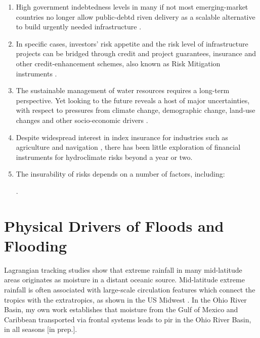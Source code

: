 \documentclass[11pt]{article}
\begin{document}
\begin{enumerate}
  \item High government indebtedness levels in many if not most emerging-market countries no longer allow public-debtd riven delivery as a scalable alternative to build urgently needed infrastructure \citep{WEF-instruments-2016}.
  \item In specific cases, investors' risk appetite and the risk level of infrastructure projects can be bridged through credit and project guarantees, insurance and other credit-enhancement schemes, also known as Risk Mitigation instruments \citep{WEF-instruments-2016}.
  \item The sustainable management of water resources requires a long-term perspective.
  Yet looking to the future reveals a host of major uncertainties, with respect to pressures from climate change, demographic change, land-use changes and other socio-economic drivers \citep{Hall2012}.
  \item Despite widespread interest in index insurance for industries such as agriculture \citep{Clarke2013} and navigation \citep{Meyer2016}, there has been little exploration of financial instruments for hydroclimate risks beyond a year or two.
  \item The insurability of risks depends on a number of factors, including:
   \citep{Wolfrom2016}.
\end{enumerate}


\section{Physical Drivers of Floods and Flooding}

Lagrangian tracking studies \citep{Gimeno2010} show that extreme rainfall in many mid-latitude areas originates as moisture in a distant oceanic source.
Mid-latitude extreme rainfall is often associated with large-scale circulation features which connect the tropics with the extratropics, as shown in the US Midwest \citep{Dirmeyer2010}.
In the Ohio River Basin, my own work establishes that moisture from the Gulf of Mexico and Caribbean transported via frontal systems leads to {pir} in the Ohio River Basin, in all seasons [in prep.].
\end{document}
